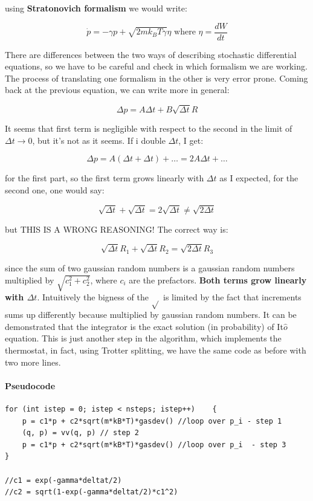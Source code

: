 \documentclass[a4paper, italian, openany]{book}
\begin{document}
using \textbf{Stratonovich formalism} we would write:

$$\dot{p} = -\gamma p + \sqrt{2 m k_B T \gamma} \eta \mbox{ where } \eta = \frac{dW}{dt}$$

There are differences between the two ways of describing stochastic differential equations, so we have to be careful and check in which formalism we are working. The process of translating one formalism in the other is very error prone.\newline
Coming back at the previous equation, we can write more in general:

$$\Delta p = A \Delta t + B \sqrt{\Delta t} R$$

It seems that first term is negligible with respect to the second in the limit of $\Delta t \to 0$, but it's not as it seems. If i double $\Delta t$, I get:

$$\Delta p = A (\Delta t + \Delta t) + \ldots = 2A\Delta t + \ldots $$

for the first part, so the first term grows linearly with $\Delta t$ as I expected, for the second one, one would say:

$$\sqrt{\Delta t} + \sqrt{\Delta t} = 2\sqrt{\Delta t} \ne \sqrt{2\Delta t}$$

but THIS IS A WRONG REASONING! The correct way is:

$$\sqrt{\Delta t}R_1 + \sqrt{\Delta t}R_2 = \sqrt{2\Delta t}R_3$$

since the sum of two gaussian random numbers is a gaussian random numbers multiplied by $\sqrt{c_1^2 + c_2^2}$, where $c_i$ are the prefactors. \textbf{Both terms grow linearly with $\Delta t$}. Intuitively the bigness of the $\sqrt{}$ is limited by the fact that increments sums up differently because multiplied by gaussian random numbers.\newline
It can be demonstrated that the integrator is the exact solution (in probability) of It$\hat{o}$ equation. This is just another step in the algorithm, which implements the thermostat, in fact, using Trotter splitting, we have the same code as before with two more lines.

\paragraph{Pseudocode}

\begin{lstlisting}
for (int istep = 0; istep < nsteps; istep++)	{
	p = c1*p + c2*sqrt(m*kB*T)*gasdev() //loop over p_i - step 1
	(q, p) = vv(q, p) // step 2
	p = c1*p + c2*sqrt(m*kB*T)*gasdev() //loop over p_i  - step 3
}

//c1 = exp(-gamma*deltat/2)
//c2 = sqrt(1-exp(-gamma*deltat/2)*c1^2)
\end{lstlisting}
\end{document}
